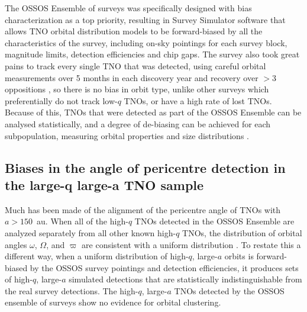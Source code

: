 \documentclass[preprint]{aastex62}
\begin{document}
The OSSOS Ensemble of surveys \citep{petit11,alexandersen16,petit17,bannister18} was specifically designed with bias characterization as a top priority, resulting in Survey Simulator software that allows TNO orbital distribution models to be forward-biased by all the characteristics of the survey, including on-sky pointings for each survey block, magnitude limits, detection efficiencies and chip gaps.
The survey also took great pains to track every single TNO that was detected, using careful orbital measurements over 5 months in each discovery year and recovery over $>3$ oppositions \citep{bannister18}, so there is no bias in orbit type, unlike other surveys which preferentially do not track low-$q$ TNOs, or have a high rate of lost TNOs.
Because of this, TNOs that were detected as part of the OSSOS Ensemble can be analysed statistically, and a degree of de-biasing can be achieved for each subpopulation, measuring orbital properties and size distributions \citep{lawler2018}.


\subsection{Biases in the angle of pericentre detection in the large-q large-a TNO sample}

Much has been made of the alignment of the pericentre angle of TNOs
with $a>150$~au.  
When all of the high-$q$ TNOs detected in the OSSOS Ensemble are analyzed separately from all other known high-$q$ TNOs, the distribution of orbital angles $\omega$, $\Omega$, and $\varpi$ are consistent with a uniform distribution \citep{shankman17bias,bannister18}.
To restate this a different way, when a uniform distribution of high-$q$, large-$a$ orbits is forward-biased by the OSSOS survey pointings and detection efficiencies, it produces sets of high-$q$, large-$a$ simulated detections that are statistically indistinguishable from the real survey detections.
The high-$q$, large-$a$ TNOs detected by the OSSOS ensemble of surveys show no evidence for orbital clustering.
\end{document}
